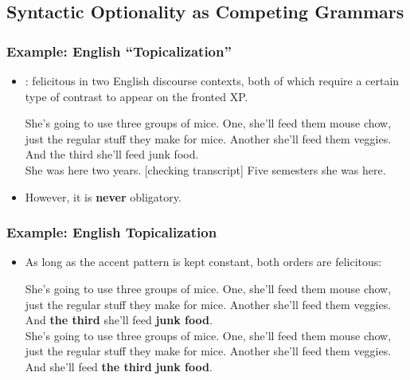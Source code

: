 \documentclass[hyperref={pdfpagelabels=false}]{beamer}
\begin{document}
\subsection{Syntactic Optionality as Competing Grammars}
\begin{frame}
\frametitle{Example: English ``Topicalization''}
\begin{itemize}
	\item \citet{prince1985,prince1998, prince1999}: felicitous in two English discourse contexts, both of which require a certain type of contrast to appear on the fronted XP.
	
	\begin{exe}
\ex \label{princetop1} She's going to use three groups of mice.
One, she'll feed them mouse chow, just the regular stuff they make for
mice.
Another she'll feed them veggies.
And the third she'll feed junk food.\\

\ex \label{princetop2} She was here two years.
[checking transcript] Five semesters she was here.\\
\citep[][8,9]{prince1999} 

\end{exe}

	\item However, it is \textbf{never} obligatory.
\end{itemize}
\end{frame}
%
\begin{frame}
\frametitle{Example: English Topicalization}
\begin{itemize}
	\item As long as the accent pattern is kept constant, both orders are felicitous:
	
	\begin{exe}
\ex \label{princetop1} She's going to use three groups of mice.
One, she'll feed them mouse chow, just the regular stuff they make for
mice.
Another she'll feed them veggies.
And \textbf{the third} she'll feed \textbf{junk food}.\\

\ex \label{untop1} She's going to use three groups of mice.
One, she'll feed them mouse chow, just the regular stuff they make for
mice.
Another she'll feed them veggies.
And she'll feed \textbf{the third} \textbf{junk food}.\\

\end{exe}

\end{itemize}
\end{frame}
\end{document}
